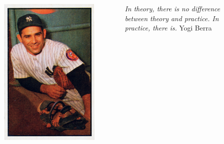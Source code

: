 \begin{frame}
\begin{columns}
    \begin{column}{.3\textwidth}
\begin{figure}[ht]
    \includegraphics[height=0.4\textheight]{graphics/1953_Bowman_Yogi_Berra}
\end{figure}
\end{column}
\begin{column}{.3\textwidth}
    \emph{In theory, there is no difference between theory and practice. \newline
    In practice, there is.}\newline
    Yogi Berra
\end{column}
\begin{column}{.3\textwidth}
\end{column}
\end{columns}
\end{frame}


